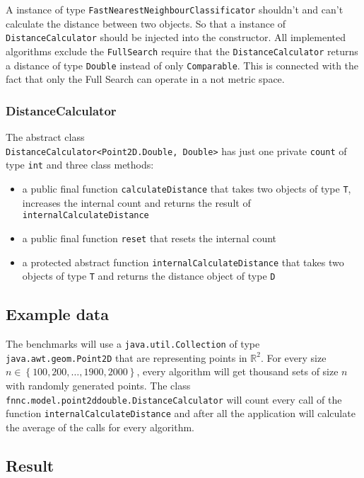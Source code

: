 \documentclass[runningheads,a4paper]{llncs}
\begin{document}
A instance of type \verb+FastNearestNeighbourClassificator+ shouldn't and can't calculate the distance between two
objects. So that a instance of \verb+DistanceCalculator+ should be injected into the constructor. All implemented
algorithms exclude the \verb+FullSearch+ require that the \verb+DistanceCalculator+ returns a distance of type
\verb+Double+ instead of only \verb+Comparable+. This is connected with the fact that only the Full Search can operate
in a not metric space.

\subsubsection{DistanceCalculator}

The abstract class\\ \verb+DistanceCalculator<Point2D.Double, Double>+ has just one private \verb+count+ of type
\verb+int+ and three class methods:
\begin{itemize}
	\item a public final function \verb+calculateDistance+ that takes two objects of type \verb+T+, increases the
		internal count and returns the result of \verb+internalCalculateDistance+
	\item a public final function \verb+reset+ that resets the internal count
	\item a protected abstract function \verb+internalCalculateDistance+ that takes two objects of type \verb+T+ and
		returns the distance object of type \verb+D+
\end{itemize}

\subsection{Example data}

The benchmarks will use a \verb+java.util.Collection+ of type\\ \verb+java.awt.geom.Point2D+ that are representing
points in $\mathbb{R}^2$. For every size $n \in \left\{ {100, 200, \dots, 1900, 2000}\right\}$, every algorithm will get
thousand sets of size $n$ with randomly generated points. The class\\ \verb+fnnc.model.point2ddouble.DistanceCalculator+
will count every call of the function \verb+internalCalculateDistance+ and after all the application will calculate the
average of the calls for every algorithm.

\subsection{Result}
\end{document}
